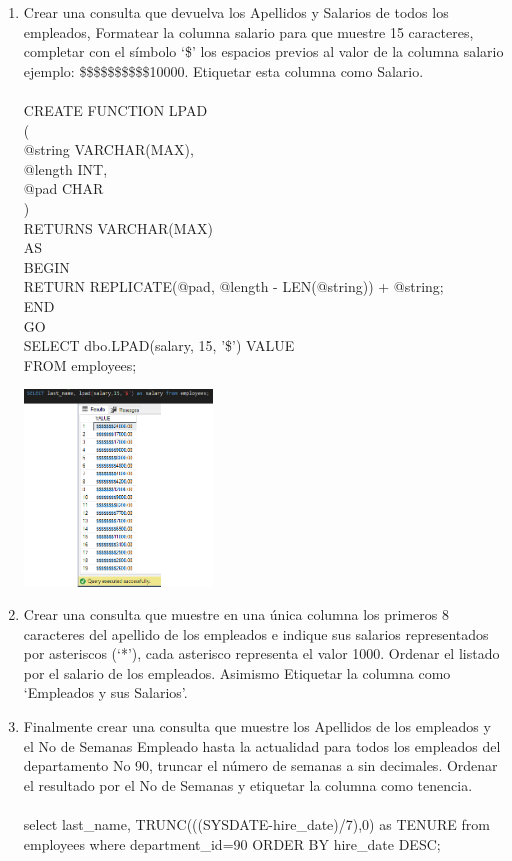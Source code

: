 \begin{enumerate}[1.]
	\item Crear una consulta que devuelva los Apellidos y Salarios de todos los empleados, Formatear la columna salario para que muestre 15 caracteres, completar con el símbolo ‘\$’ los espacios previos al valor de la columna salario ejemplo: \$\$\$\$\$\$\$\$\$\$10000. Etiquetar esta columna como Salario.
	\\
	\\CREATE FUNCTION LPAD
	\\(
	\\ @string VARCHAR(MAX), 
	\\@length INT,          
	\\@pad CHAR             
	\\)
	\\RETURNS VARCHAR(MAX)
	\\AS
	\\BEGIN
	    \\RETURN REPLICATE(@pad, @length - LEN(@string)) + @string;
	\\END
	\\GO
	\\SELECT dbo.LPAD(salary, 15, '\$') VALUE
	\\FROM employees;
	\begin{center}
		\includegraphics[width=5cm]{./Imagenes/actividad_05_07}
	\end{center}

	\item Crear una consulta que muestre en una única columna los primeros 8 caracteres del apellido de los empleados e indique sus salarios representados por asteriscos (‘*’), cada asterisco representa el valor 1000. Ordenar el listado por el salario de los empleados. Asimismo Etiquetar la columna como ‘Empleados y sus Salarios’.
	\item Finalmente crear una consulta que muestre los Apellidos de los empleados y el No de Semanas Empleado hasta la actualidad para todos los empleados del departamento No 90, truncar el número de semanas a sin decimales. Ordenar el resultado por el No de Semanas y etiquetar la columna como tenencia.
	\\
	\\select last\_name, TRUNC(((SYSDATE-hire\_date)/7),0) as TENURE from employees where department\_id=90 ORDER BY hire\_date DESC;
\end{enumerate}

